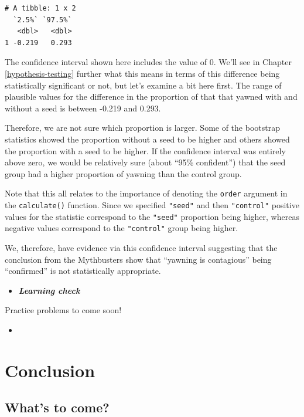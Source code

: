 \documentclass[12pt,]{krantz}
\newenvironment{rmdblock}[1]
  {\begin{shaded*}
  \begin{itemize}
  \renewcommand{\labelitemi}{
    \raisebox{-.7\height}[0pt][0pt]{
    }
  }
  \item
  }
  {
  \end{itemize}
  \end{shaded*}
  }
\newenvironment{learncheck}
  {\begin{rmdblock}{warning}}
  {\end{rmdblock}}
\begin{document}
\begin{verbatim}
# A tibble: 1 x 2
  `2.5%` `97.5%`
   <dbl>   <dbl>
1 -0.219   0.293
\end{verbatim}

The confidence interval shown here includes the value of 0. We'll see in
Chapter \ref{hypothesis-testing} further what this means in terms of
this difference being statistically significant or not, but let's
examine a bit here first. The range of plausible values for the
difference in the proportion of that that yawned with and without a seed
is between -0.219 and 0.293.

Therefore, we are not sure which proportion is larger. Some of the
bootstrap statistics showed the proportion without a seed to be higher
and others showed the proportion with a seed to be higher. If the
confidence interval was entirely above zero, we would be relatively sure
(about ``95\% confident'') that the seed group had a higher proportion
of yawning than the control group.

Note that this all relates to the importance of denoting the
\texttt{order} argument in the \texttt{calculate()} function. Since we
specified \texttt{"seed"} and then \texttt{"control"} positive values
for the statistic correspond to the \texttt{"seed"} proportion being
higher, whereas negative values correspond to the \texttt{"control"}
group being higher.

We, therefore, have evidence via this confidence interval suggesting
that the conclusion from the Mythbusters show that ``yawning is
contagious'' being ``confirmed'' is not statistically appropriate.

\begin{learncheck}
\textbf{\emph{Learning check}}
\end{learncheck}

Practice problems to come soon!

\begin{learncheck}

\end{learncheck}

\section{Conclusion}\label{conclusion-7}

\subsection{What's to come?}\label{whats-to-come-6}
\end{document}
